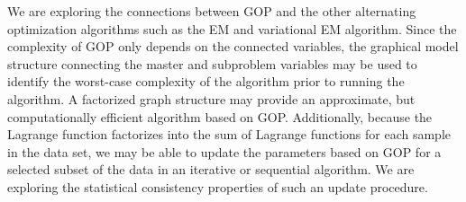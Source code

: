 \documentclass{article} %
\begin{document}
We are exploring the connections between GOP and the other alternating
optimization algorithms such as the EM and variational EM algorithm. Since the
complexity of GOP only depends on the connected variables, the graphical model
structure connecting the master and subproblem variables may be used to
identify the worst-case complexity of the algorithm prior to running the
algorithm. A factorized graph structure may provide an approximate, but
computationally efficient algorithm based on GOP. Additionally, because the
Lagrange function factorizes into the sum of Lagrange functions for each sample
in the data set, we may be able to update the parameters based on GOP for a
selected subset of the data in an iterative or sequential algorithm. We are
exploring the statistical consistency properties of such an update procedure.

\end{document}
